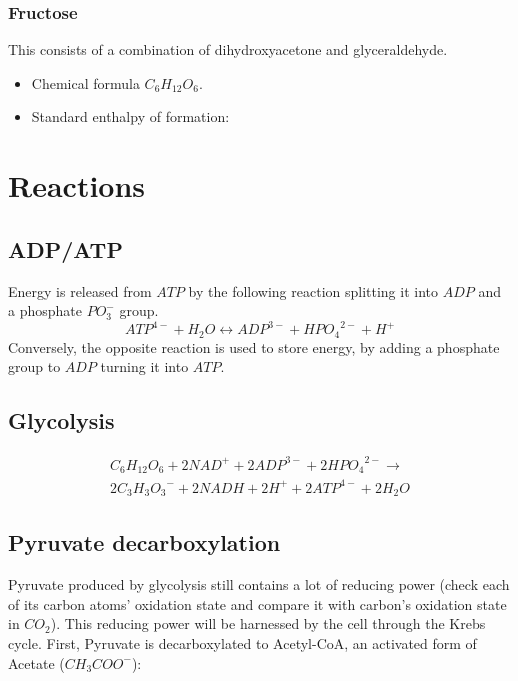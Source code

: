 \documentclass[a4paper,14pt]{extarticle}
\begin{document}
\subsubsection{Fructose}
This consists of a combination of dihydroxyacetone and glyceraldehyde.

\begin{itemize}
    \item Chemical formula $C_6H_{12}O_6$.
    \item Standard enthalpy of formation:
\end{itemize}



\pagebreak
\section{Reactions}\label{sec_reactions}

\subsection{ADP/ATP}
Energy is released from $\mathit{ATP}$ by the following reaction splitting it into
$\mathit{ADP}$ and a phosphate $PO_3^-$ group.
\[
    {ATP}^{4-} + H_2O \leftrightarrow {ADP}^{3-} + {HPO_4}^{2-} + H^+
\]
Conversely, the opposite reaction is used to store energy, by adding a phosphate group to
$\mathit{ADP}$ turning it into $\mathit{ATP}$.

\subsection{Glycolysis}
\[
    \begin{split}
    C_6H_{12}O_6 + 2{NAD}^+ + 2{ADP}^{3-} + 2{HPO_4}^{2-} \rightarrow \\
    2{C_3H_3O_3}^- + 2NADH + 2H^+ + 2{ATP}^{4-} + 2H_2O
    \end{split}
\]

\subsection{Pyruvate decarboxylation}
Pyruvate produced by glycolysis still contains a lot of reducing power (check each of its
carbon atoms' oxidation state and compare it with carbon's oxidation state in $CO_2$).
This reducing power will be harnessed by the cell through the Krebs cycle. First, Pyruvate
is decarboxylated to Acetyl-CoA, an activated form of Acetate ($CH_3COO^-$):
\end{document}
